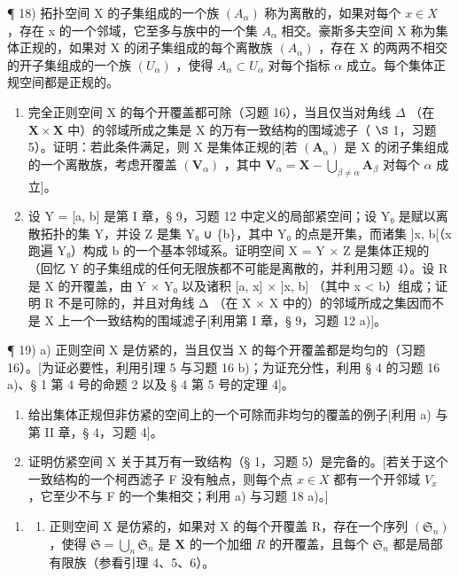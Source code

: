 ¶ 18) 拓扑空间 X 的子集组成的一个族 \((A_{\alpha})\) 称为离散的，如果对每个 \(x \in X\) ，存在 x 的一个邻域，它至多与族中的一个集 \(A_{\alpha}\) 相交。豪斯多夫空间 X 称为集体正规的，如果对 X 的闭子集组成的每个离散族 \((A_{\alpha})\) ，存在 X 的两两不相交的开子集组成的一个族 \((U_{\alpha})\) ，使得 \(A_{\alpha} \subset U_{\alpha}\) 对每个指标 \(\alpha\) 成立。每个集体正规空间都是正规的。

\begin{enumerate}
\def\labelenumi{\alph{enumi})}
\item
  完全正则空间 X 的每个开覆盖都可除（习题 16），当且仅当对角线 \(\Delta\) （在 \(\mathbf{X} \times \mathbf{X}\) 中）的邻域所成之集是 X 的万有一致结构的围域滤子（ \(\S\) 1，习题 5）。证明：若此条件满足，则 X 是集体正规的{[}若 \((\mathbf{A}_{\alpha})\) 是 X 的闭子集组成的一个离散族，考虑开覆盖 \((\mathbf{V}_{\alpha})\) ，其中 \(\mathbf{V}_{\alpha} = \mathbf{X} - \bigcup_{\beta \neq \alpha} \mathbf{A}_{\beta}\) 对每个 \(\alpha\) 成立{]}。
\item
  设 Y = {[}a, b{]} 是第 I 章，§ 9，习题 12 中定义的局部紧空间；设 Y₀ 是赋以离散拓扑的集 Y，并设 Z 是集 Y₀ ∪ \{b\}，其中 Y₀ 的点是开集，而诸集 {]}x, b{[}（x 跑遍 Y₀）构成 b 的一个基本邻域系。证明空间 X = Y × Z 是集体正规的（回忆 Y 的子集组成的任何无限族都不可能是离散的，并利用习题 4）。设 R 是 X 的开覆盖，由 Y × Y₀ 以及诸积 {[}a, x{]} × {]}x, b{]} （其中 x \textless{} b）组成；证明 R 不是可除的，并且对角线 Δ （在 X × X 中的）的邻域所成之集因而不是 X 上一个一致结构的围域滤子{[}利用第 I 章，§ 9，习题 12 a){]}。
\end{enumerate}

¶ 19) a) 正则空间 X 是仿紧的，当且仅当 X 的每个开覆盖都是均匀的（习题 16）。{[}为证必要性，利用引理 5 与习题 16 b)；为证充分性，利用 § 4 的习题 16 a)、§ 1 第 4 号的命题 2 以及 § 4 第 5 号的定理 4{]}。

\begin{enumerate}
\def\labelenumi{\alph{enumi})}
\setcounter{enumi}{1}
\item
  给出集体正规但非仿紧的空间上的一个可除而非均匀的覆盖的例子{[}利用 a) 与第 II 章，§ 4，习题 4{]}。
\item
  证明仿紧空间 X 关于其万有一致结构（§ 1，习题 5）是完备的。{[}若关于这个一致结构的一个柯西滤子 F 没有触点，则每个点 \(x \in X\) 都有一个开邻域 \(V_{x}\) ，它至少不与 F 的一个集相交；利用 a) 与习题 18 a)。{]}
\end{enumerate}

\begin{enumerate}
\def\labelenumi{\arabic{enumi})}
\setcounter{enumi}{19}
\tightlist
\item
  \begin{enumerate}
  \def\labelenumii{\alph{enumii})}
  \tightlist
  \item
    正则空间 X 是仿紧的，如果对 X 的每个开覆盖 R，存在一个序列 \((\mathfrak{S}_{n})\) ，使得 \(\mathfrak{S} = \bigcup_{n} \mathfrak{S}_{n}\) 是 \(\mathbf{X}\) 的一个加细 \(R\) 的开覆盖，且每个 \(\mathfrak{S}_n\) 都是局部有限族（参看引理 4、5、6）。
  \end{enumerate}
\end{enumerate}

